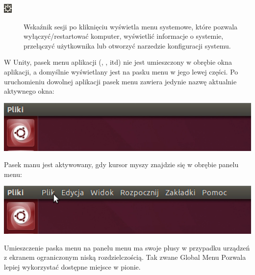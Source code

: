 \begin{description}
\item[\includegraphics{images/unity_wskaznik_system.png}]\textcolor{ubuntu_orange}{Wskaźnik sesji} po kliknięciu wyświetla menu systemowe, które pozwala wyłączyć/restartować komputer, wyświetlić informacje o systemie, przełączyć użytkownika lub otworzyć narzedzie konfiguracji systemu.
\end{description}

\label{unity_menu_bar}
W Unity, pasek menu aplikacji (, ,  itd) nie jest umieszczony w obrębie okna aplikacji, a domyślnie wyświetlany jest na pasku menu w jego lewej części. Po uruchomieniu dowolnej aplikacji pasek menu zawiera jedynie nazwę aktualnie aktywnego okna:

\begin{center}
	\includegraphics[width=\linewidth]{images/unity_menu_bar2.png}
\end{center}

Pasek manu jest aktywowany, gdy kursor myszy znajdzie się w obrębie panelu menu:

\begin{center}
	\includegraphics[width=\linewidth]{images/unity_menu_bar3.png}
\end{center}

Umieszczenie paska menu na panelu menu ma swoje plusy w przypadku urządzeń z ekranem ograniczonym niską rozdzielczością. Tak zwane \textcolor{ubuntu_orange}{Global Menu} Pozwala lepiej wykorzystać dostępne miejsce w pionie.